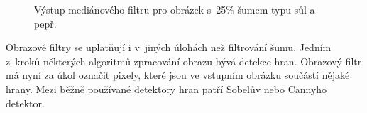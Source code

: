 \begin{figure}[htb]
    \centering
    \caption{Výstup mediánového filtru pro obrázek s~25\% šumem typu sůl a pepř.}
    \label{obrMedian}
\end{figure}

Obrazové filtry se uplatňují i v~jiných úlohách než filtrování šumu. Jedním z~kroků některých algoritmů zpracování obrazu bývá detekce hran. Obrazový filtr má nyní za úkol označit pixely, které jsou ve vstupním obrázku součástí nějaké hrany. Mezi běžně používané detektory hran patří Sobelův nebo Cannyho detektor.

